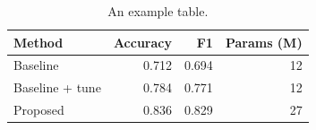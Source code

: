 \begin{table}[htbp]
  \centering
  \caption{An example table.}
  \label{tab:example}
  \begin{tabular}{lrrr}
    \toprule
    Method & Accuracy & F1 & Params (M) \\
    \midrule
    Baseline        & 0.712 & 0.694 & 12 \\
    Baseline + tune & 0.784 & 0.771 & 12 \\
    Proposed        & 0.836 & 0.829 & 27 \\
    \bottomrule
  \end{tabular}
\end{table}
